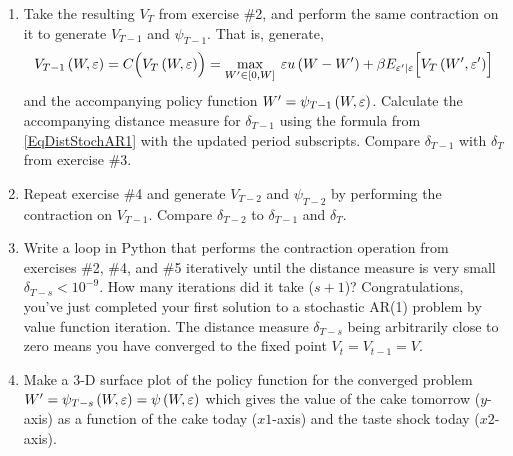 \begin{enumerate}
   \item Take the resulting $V_T$ from exercise \#2, and perform the same contraction on it to generate $V_{T-1}$ and $\psi_{T-1}$. That is, generate,
   \begin{equation*}
      V_{T-1}\left(W,\varepsilon\right) = C\Bigl(V_T\left(W,\varepsilon\right)\Bigr) = \max_{W'\in[0,W]}\: \varepsilon u\left(W - W'\right) + \beta E_{\varepsilon'|\varepsilon}\Bigl[V_T\left(W',\varepsilon'\right)\Bigr]
   \end{equation*}
   and the accompanying policy function $W'=\psi_{T-1}\left(W,\varepsilon\right)$. Calculate the accompanying distance measure for $\delta_{T-1}$ using the formula from \eqref{EqDistStochAR1} with the updated period subscripts. Compare $\delta_{T-1}$ with $\delta_T$ from exercise \#3.

   \item Repeat exercise \#4 and generate $V_{T-2}$ and $\psi_{T-2}$ by performing the contraction on $V_{T-1}$. Compare $\delta_{T-2}$ to $\delta_{T-1}$ and $\delta_{T}$.

   \item Write a loop in Python that performs the contraction operation from exercises \#2, \#4, and \#5 iteratively until the distance measure is very small $\delta_{T-s} < 10^{-9}$. How many iterations did it take ($s+1$)? Congratulations, you've just completed your first solution to a stochastic AR(1) problem by value function iteration. The distance measure $\delta_{T-s}$ being arbitrarily close to zero means you have converged to the fixed point $V_{t} = V_{t-1} = V$.

   \item Make a 3-D surface plot of the policy function for the converged problem $W' = \psi_{T-s}\left(W,\varepsilon\right) = \psi\left(W,\varepsilon\right)$ which gives the value of the cake tomorrow ($y$-axis) as a function of the cake today ($x1$-axis) and the taste shock today ($x2$-axis).

\end{enumerate} 